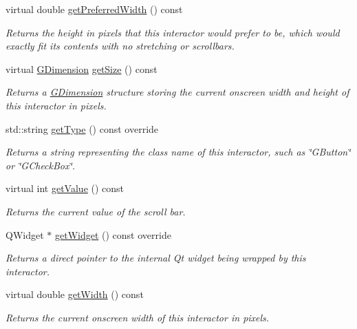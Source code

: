 \begin{DoxyCompactItemize}
virtual double \mbox{\hyperlink{classGInteractor_a82bca31d37700fb0e35d2743352efd5e}{get\+Preferred\+Width}} () const
\begin{DoxyCompactList}\small\item\em Returns the height in pixels that this interactor would prefer to be, which would exactly fit its contents with no stretching or scrollbars. \end{DoxyCompactList}\item 
virtual \mbox{\hyperlink{structGDimension}{G\+Dimension}} \mbox{\hyperlink{classGInteractor_a7b4eec96a2bdc6420695d5796a78eea9}{get\+Size}} () const
\begin{DoxyCompactList}\small\item\em Returns a \mbox{\hyperlink{structGDimension}{G\+Dimension}} structure storing the current onscreen width and height of this interactor in pixels. \end{DoxyCompactList}\item 
std\+::string \mbox{\hyperlink{classGScrollBar_a9b72ede4ee8520f987a0c01e30654814}{get\+Type}} () const override
\begin{DoxyCompactList}\small\item\em Returns a string representing the class name of this interactor, such as \char`\"{}\+G\+Button\char`\"{} or \char`\"{}\+G\+Check\+Box\char`\"{}. \end{DoxyCompactList}\item 
virtual int \mbox{\hyperlink{classGScrollBar_acdb0b383a96801f3200302b6f4a7da64}{get\+Value}} () const
\begin{DoxyCompactList}\small\item\em Returns the current value of the scroll bar. \end{DoxyCompactList}\item 
Q\+Widget $\ast$ \mbox{\hyperlink{classGScrollBar_a3b33a602b31a6b809d020535a59db3b4}{get\+Widget}} () const override
\begin{DoxyCompactList}\small\item\em Returns a direct pointer to the internal Qt widget being wrapped by this interactor. \end{DoxyCompactList}\item 
virtual double \mbox{\hyperlink{classGInteractor_a0ed2965abd4f5701d2cadf71239faf19}{get\+Width}} () const
\begin{DoxyCompactList}\small\item\em Returns the current onscreen width of this interactor in pixels. \end{DoxyCompactList}\item 

\end{DoxyCompactItemize}
